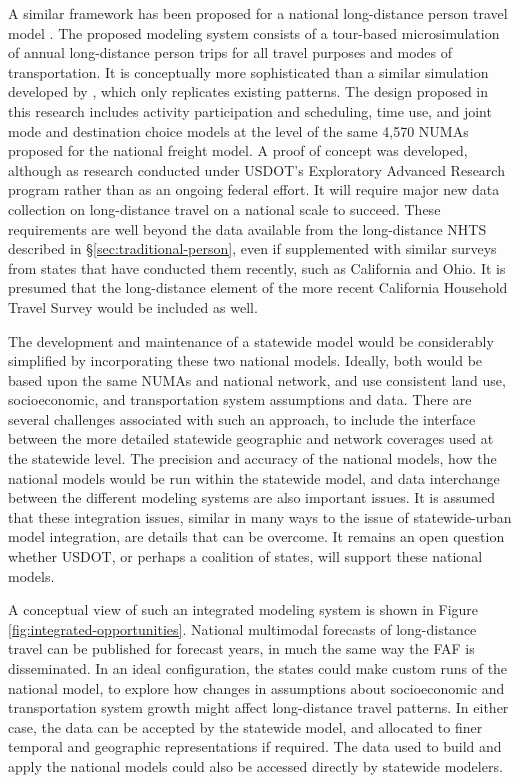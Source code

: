 A similar framework has been proposed for a national long-distance person travel model \citep{outwater14}. The proposed modeling system consists of a tour-based microsimulation of annual long-distance person trips for all travel purposes and modes of transportation. It is conceptually more sophisticated than a similar simulation developed by \cite{moeckel11}, which only replicates existing patterns. The design proposed in this research includes activity participation and scheduling, time use, and joint mode and destination choice models at the level of the same 4,570 NUMAs proposed for the national freight model. A proof of concept was developed, although as research conducted under USDOT's Exploratory Advanced Research program rather than as an ongoing federal effort. It will require major new data collection on long-distance travel on a national scale to succeed. These requirements are well beyond the data available from the long-distance NHTS described in \S\ref{sec:traditional-person}, even if supplemented with similar surveys from states that have conducted them recently, such as California and Ohio. It is presumed that the long-distance element of the more recent California Household Travel Survey would be included as well.

The development and maintenance of a statewide model would be considerably simplified by incorporating these two national models. Ideally, both would be based upon the same NUMAs and national network, and use consistent land use, socioeconomic, and transportation system assumptions and data. There are several challenges associated with such an approach, to include the interface between the more detailed statewide geographic and network coverages used at the statewide level. The precision and accuracy of the national models, how the national models would be run within the statewide model, and data interchange between the different modeling systems are also important issues. It is assumed that these integration issues, similar in many ways to the issue of statewide-urban model integration, are details that can be overcome. It remains an open question whether USDOT, or perhaps a coalition of states, will support these national models.

A conceptual view of such an integrated modeling system is shown in Figure \ref{fig:integrated-opportunities}. National multimodal forecasts of long-distance travel can be published for forecast years, in much the same way the FAF is disseminated. In an ideal configuration, the states could make custom runs of the national model, to explore how changes in assumptions about socioeconomic and transportation system growth might affect long-distance travel patterns. In either case, the data can be accepted by the statewide model, and allocated to finer temporal and geographic representations if required. The data used to build and apply the national models could also be accessed directly by statewide modelers.

